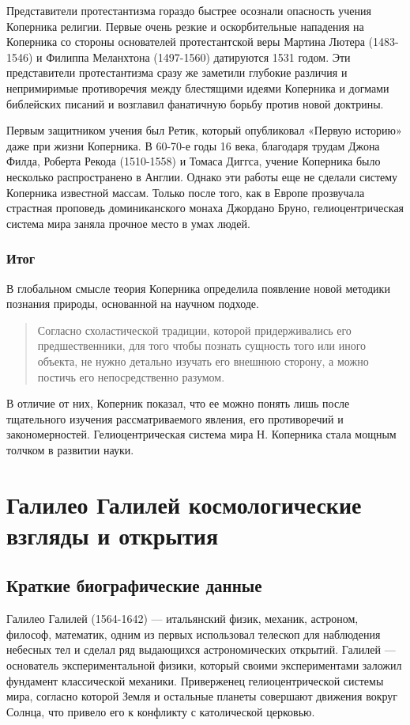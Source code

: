 \documentclass[a4paper, 14pt]{extreport}
\begin{document}
Представители протестантизма гораздо быстрее осознали опасность учения
Коперника религии. Первые очень резкие и оскорбительные нападения на
Коперника со стороны основателей протестантской веры Мартина Лютера
(1483-1546) и Филиппа Меланхтона (1497-1560) датируются 1531 годом. Эти
представители протестантизма сразу же заметили глубокие различия и
непримиримые противоречия между блестящими идеями Коперника и догмами
библейских писаний и возглавил фанатичную борьбу против новой доктрины.

Первым защитником учения был Ретик, который опубликовал «Первую историю»
даже при жизни Коперника. В 60-70-е годы 16 века, благодаря трудам Джона
Филда, Роберта Рекода (1510-1558) и Томаса Диггса, учение Коперника было
несколько распространено в Англии. Однако эти работы еще не сделали
систему Коперника известной массам. Только после того, как в Европе
прозвучала страстная проповедь доминиканского монаха Джордано Бруно,
гелиоцентрическая система мира заняла прочное место в умах людей.

\subsubsection{Итог}

В глобальном смысле теория Коперника определила появление новой методики
познания природы, основанной на научном подходе.

\begin{quote}
Согласно схоластической традиции, которой придерживались его
предшественники, для того чтобы познать сущность того или иного объекта,
не нужно детально изучать его внешнюю сторону, а можно постичь его
непосредственно разумом.
\end{quote}

В отличие от них, Коперник показал, что ее можно понять лишь после
тщательного изучения рассматриваемого явления, его противоречий и
закономерностей. Гелиоцентрическая система мира Н. Коперника стала
мощным толчком в развитии науки.

\section{Галилео Галилей космологические взгляды и открытия}

\subsection{Краткие биографические данные}

Галилео Галилей (1564-1642) --- итальянский физик, механик, астроном,
философ, математик, одним из первых использовал телескоп для наблюдения
небесных тел и сделал ряд выдающихся астрономических открытий. Галилей
--- основатель экспериментальной физики, который своими экспериментами
заложил фундамент классической механики. Приверженец гелиоцентрической
системы мира, согласно которой Земля и остальные планеты совершают
движения вокруг Солнца, что привело его к конфликту с католической
церковью.
\end{document}
